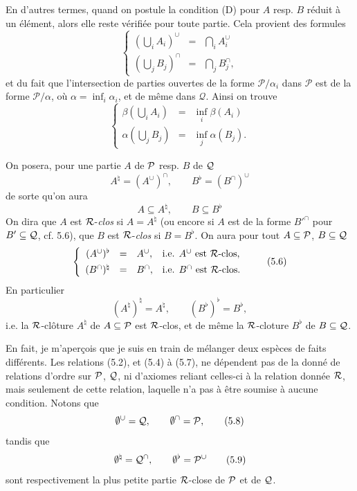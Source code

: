 En d'autres termes, quand on postule la condition (D) pour $A$ resp. $B$ réduit à un élément, alors elle reste vérifiée pour toute partie. Cela provient des formules
\[
\left\{
\begin{array}{lcl}
(\bigcup_i A_i)^\cup & = & \bigcap_i A_i^\cup \\[1ex]
(\bigcup_j B_j)^\cap & = & \bigcap_j B_j^\cap,
\end{array}
\right.
\tag*{(5.2)}
\]
et du fait que l'intersection de parties ouvertes de la forme $\mathcal{P}/\alpha_i$ dans $\mathcal{P}$ est de la forme $\mathcal{P}/\alpha$, où $\alpha = \inf_i \alpha_i$, et de même dans $\mathcal{Q}$. Ainsi on trouve
\[
\left\{
\begin{array}{lcl}
\beta(\bigcup_i A_i) & = & \inf_i \beta(A_i) \\[1ex]
\alpha(\bigcup_j B_j) & = & \inf_j \alpha(B_j).
\end{array}
\right.
\tag*{(5.3)}
\]


On posera, pour une partie $A$ de $\mathcal{P}$ resp. $B$ de $\mathcal{Q}$
\[
A^{\natural} = (A^{\cup})^{\cap}, \qquad B^{\flat} = (B^{\cap})^{\cup}
\tag*{(5.4)}
\]
de sorte qu'on aura
\[
A \subseteq A^{\natural}, \qquad B \subseteq B^{\flat}
\tag*{(5.5)}
\]
On dira que $A$ est $\mathcal{R}$-\textit{clos} si $A = A^{\natural}$ (ou encore si $A$ est de la forme $B'^{\cap}$ pour $B' \subseteq \mathcal{Q}$, cf. 5.6), que
$B$ est $\mathcal{R}$-\textit{clos} si $B = B^{\flat}$. On aura pour tout $A \subseteq \mathcal{P}$, $B \subseteq \mathcal{Q}$
\[
\left\{
\begin{array}{rcll}
(A^{\cup})^{\flat} & = & A^{\cup}, & \text{i.e. } A^{\cup} \text{ est } \cR\text{-clos,}\\[1ex]
(B^{\cap})^{\natural} & = & B^{\cap}, & \text{i.e. } B^{\cap} \text{ est } \cR\text{-clos.}
\end{array}
\right.
\tag*{(5.6)}
\]
En particulier
\[
(A^{\natural})^{\natural} = A^{\natural}, \qquad (B^{\flat})^{\flat} = B^{\flat},
\tag*{(5.7)}
\]
i.e. la $\mathcal{R}$-clôture $A^{\natural}$ de $A \subseteq \mathcal{P}$ est $\mathcal{R}$-clos, et de même la $\mathcal{R}$-cloture $B^{\flat}$ de $B \subseteq \mathcal{Q}$. %

En fait, je m'aperçois que je suis en train de mélanger deux espèces de faits différents. Les relations (5.2), et (5.4) à (5.7), ne dépendent pas de la donné de relations d'ordre sur $\mathcal{P}$, $\mathcal{Q}$, ni d'axiomes reliant celles-ci à la relation donnée $\mathcal{R}$, mais seulement de cette relation, laquelle n'a pas à être soumise à aucune condition. Notons que %
\[
\emptyset^{\cup} = \cQ, \qquad \emptyset^{\cap} = \cP,
\tag*{(5.8)}
\]
tandis que
\[
\emptyset^{\natural} = \cQ^{\cap}, \qquad \emptyset^{\flat} = \cP^{\cup}
\tag*{(5.9)}
\]
sont respectivement la plus petite partie $\mathcal{R}$-close de $\mathcal{P}$ et de $\mathcal{Q}$.

